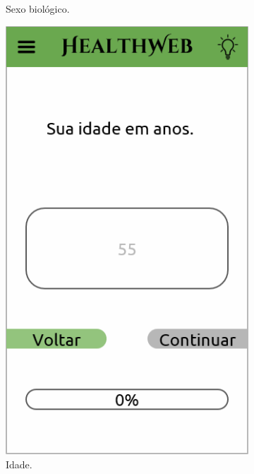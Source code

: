 \begin{figure}[htbp]
\begin{subfigure}{0.24\linewidth}
		\caption{Sexo biológico.}
		\label{fig:mobile:bio_sex}
	\end{subfigure}
	\hfill
	\begin{subfigure}{0.24\linewidth}
		\centering
		\includegraphics[width=\linewidth]{figure/prototype/mobile/age.png}
		\caption{Idade.}
		\label{fig:mobile:age}
	\end{subfigure}
	\hfill
	\begin{subfigure}{0.24\linewidth}
		\centering

\end{subfigure}
\end{figure}
